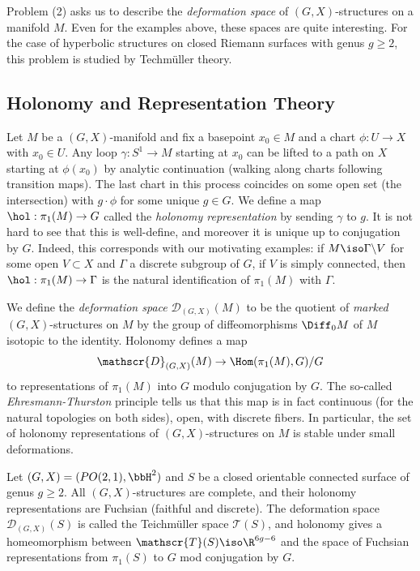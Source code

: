 \documentclass{article}
\begin{document}
Problem (2) asks us to describe the \textit{deformation space} of $(G,X)$-structures on a manifold $M$. Even for the examples above, these spaces are quite interesting. For the case of hyperbolic structures on closed Riemann surfaces with genus $g \geq 2$, this problem is studied by Techm\"uller theory.

\subsection{Holonomy and Representation Theory}
Let $M$ be a $(G,X)$-manifold and fix a basepoint $x_0 \in M$ and a chart $\phi: U \to X$ with $x_0 \in U$. Any loop $\gamma: S^1 \to M$ starting at $x_0$ can be lifted to a path on $X$ starting at $\phi(x_0)$ by analytic continuation (walking along charts following transition maps). The last chart in this process coincides on some open set (the intersection) with $g \cdot \phi$ for some unique $g \in G$. We define a map $\hol: \pi_1(M) \to G$ called the \textit{holonomy representation} by sending $\gamma$ to $g$. It is not hard to see that this is well-define, and moreover it is unique up to conjugation by $G$. Indeed, this corresponds with our motivating examples: if $M \iso \Gamma \backslash V$ for some open $V \subset X$ and $\Gamma$ a discrete subgroup of $G$, if $V$ is simply connected, then $\hol: \pi_1(M) \to \Gamma$ is the natural identification of $\pi_1(M)$ with $\Gamma$.

We define the \textit{deformation space} $\mathscr{D}_{(G,X)}(M)$ to be the quotient of \textit{marked} $(G,X)$-structures on $M$ by the group of diffeomorphisms $\Diff_0M$ of $M$ isotopic to the identity. Holonomy defines a map \[\mathscr{D}_{(G,X)}(M) \to \Hom(\pi_1(M),G)/G\] to representations of $\pi_1(M)$ into $G$ modulo conjugation by $G$. The so-called \textit{Ehresmann-Thurston} principle tells us that this map is in fact continuous (for the natural topologies on both sides), open, with discrete fibers. In particular, the set of holonomy representations of $(G,X)$-structures on $M$ is stable under small deformations.

\begin{example}
	Let $(G,X) = (PO(2,1), \bbH^2)$ and $S$ be a closed orientable connected surface of genus $g \geq 2$. All $(G,X)$-structures are complete, and their holonomy representations are Fuchsian (faithful and discrete). The deformation space $\mathscr{D}_{(G,X)}(S)$ is called the Teichm\"uller space $\mathscr{T}(S)$, and holonomy gives a homeomorphism between $\mathscr{T}(S) \iso \R^{6g - 6}$ and the space of Fuchsian representations from $\pi_1(S)$ to $G$ mod conjugation by $G$.
\end{example}
\end{document}
